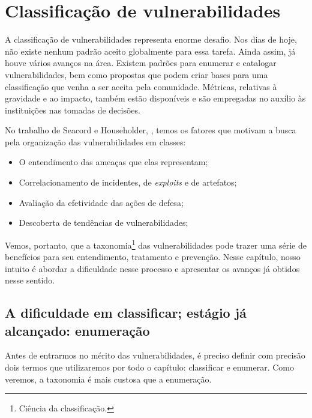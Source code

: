 
\chapter{Classificação de vulnerabilidades}
\label{chap:classificacao}

	A classificação de vulnerabilidades representa enorme desafio.
	Nos dias de hoje, não existe nenhum padrão aceito globalmente para essa tarefa.
	Ainda assim, já houve vários avanços na área. 
	Existem padrões para enumerar e catalogar vulnerabilidades, bem como propostas
	que podem criar bases para uma classificação que venha a ser aceita pela comunidade.
	Métricas, relativas	à gravidade e ao impacto, também estão disponíveis
	e são empregadas no auxílio às instituições nas tomadas	de decisões.

	
	No trabalho de Seacord e Householder, \cite{Seacord2005}, temos os fatores que motivam a
	busca pela organização das vulnerabilidades em classes:
	\begin{itemize}
		\item{O entendimento das ameaças que elas representam;}
		\item{Correlacionamento de incidentes, de \textsl{exploits} e de artefatos;}
		\item{Avaliação da efetividade das ações de defesa;}
		\item{Descoberta de tendências de vulnerabilidades;}
	\end{itemize}

	
	Vemos, portanto, que a taxonomia\footnote{Ciência da classificação.} das vulnerabilidades
	pode trazer uma série de benefícios para seu entendimento, tratamento e prevenção.
	Nesse capítulo, nosso intuito é abordar a dificuldade nesse processo e apresentar
	os avanços já obtidos nesse sentido.  


	\section{A dificuldade em classificar; estágio já alcançado: enumeração}
		Antes de entrarmos no mérito das vulnerabilidades, é preciso definir
		com precisão dois termos que utilizaremos por todo o capítulo: classificar e enumerar.
		Como veremos, a taxonomia é mais custosa que a enumeração.


